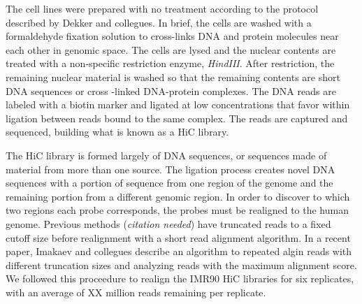 \documentclass[phd,tocprelim]{cornell}
\begin{document}
The cell lines were prepared with no treatment according to the protocol
described by Dekker and collegues\cite{Dekker2013}.  In brief, the cells
are washed with a formaldehyde fixation solution to cross-links
DNA and protein molecules near each other in genomic space.  The cells are
lysed and the nuclear contents are treated with a non-specific restriction
enzyme, \textit{HindIII}.  After restriction, the remaining nuclear material
is washed so that the remaining contents are short DNA sequences or cross
-linked DNA-protein complexes.  The DNA reads are labeled with a biotin
marker and ligated at low concentrations that favor within ligation between
reads bound to the same complex.  The reads are captured and sequenced,
building what is known as a HiC library.

The HiC library is formed largely of  DNA sequences, or
sequences made of material from more than one source.  The ligation process
creates novel DNA sequences with a portion of sequence from one region of
the genome and the remaining portion from a different genomic region.  In
order to discover to which two regions each probe corresponds, the probes
must be realigned to the human genome.  Previous methods (\textit{citation needed})
have truncated reads to a fixed cutoff size before realignment with a short
read alignment algorithm.  In a recent paper, Imakaev and collegues
describe an algorithm to repeated algin reads with different truncation sizes
and analyzing reads with the maximum alignment score\cite{Imakaev2012}.  We followed
this proceedure to realign the IMR90 HiC libraries for six replicates,
with an average of XX million reads remaining per replicate.



\end{document}
